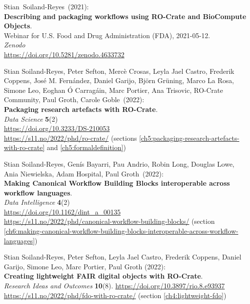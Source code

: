 \begin{thebibliography}{9}
Stian~Soiland-Reyes~(2021):\\
\textbf{Describing and packaging workflows using RO-Crate and BioCompute Objects}.\\
Webinar for U.S. Food and Drug Administration
(FDA), 2021-05-12.\\
\emph{Zenodo}\\
\url{https://doi.org/10.5281/zenodo.4633732}

Stian Soiland-Reyes, Peter Sefton, Mercè
Crosas, Leyla Jael Castro, Frederik Coppens, José M. Fernández, Daniel
Garijo, Björn Grüning, Marco La Rosa, Simone Leo, Eoghan Ó Carragáin,
Marc Portier, Ana Trisovic, RO-Crate Community, Paul Groth, Carole Goble~(2022):\\
\textbf{Packaging research artefacts with RO-Crate}.\\
\emph{Data Science} \textbf{5}(2)\\
\url{https://doi.org/10.3233/DS-210053}\\
\url{https://s11.no/2022/phd/ro-crate/}
(sections \vref{ch5:packaging-research-artefacts-with-ro-crate} and \vref{ch5:formaldefinition})

Stian Soiland-Reyes, Genís Bayarri, Pau
Andrio, Robin Long, Douglas Lowe, Ania Niewielska, Adam Hospital, Paul
Groth~(2022):\\
\textbf{Making Canonical Workflow Building Blocks interoperable across workflow languages}.\\
\emph{Data Intelligence} \textbf{4}(2)\\
\url{https://doi.org/10.1162/dint_a_00135}\\
\url{https://s11.no/2022/phd/canonical-workflow-building-blocks/}
(section \vref{ch6:making-canonical-workflow-building-blocks-interoperable-across-workflow-languages})

Stian Soiland-Reyes, Peter Sefton, Leyla Jael Castro, Frederik Coppens,
Daniel Garijo, Simone Leo, Marc Portier, Paul Groth (2022): \\
\textbf{Creating lightweight FAIR digital objects with RO-Crate}.\\
\emph{Research Ideas and Outcomes} \textbf{10}(8).
\url{https://doi.org/10.3897/rio.8.e93937} \\
\url{https://s11.no/2022/phd/fdo-with-ro-crate/}
(section \vref{ch4:lightweight-fdo})


\end{thebibliography}
